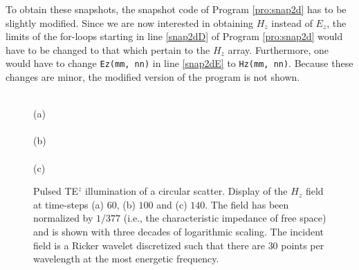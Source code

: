 To obtain these snapshots, the snapshot code of Program
\ref{pro:snap2d} has to be slightly modified.  Since we are now
interested in obtaining $H_z$ instead of $E_z$, the limits of the
for-loops starting in line \ref{snap2dD} of Program \ref{pro:snap2d}
would have to be changed to that which pertain to the $H_z$ array.
Furthermore, one would have to change \verb+Ez(mm, nn)+ in line
\ref{snap2dE} to \verb+Hz(mm, nn)+.  Because these changes are minor,
the modified version of the program is not shown.

\begin{figure}
  \begin{center}
  \\
  (a)
  \\
  \\
  (b)
  \\
  \\
  (c)
  \end{center} \caption{Pulsed TE$^z$ illumination of a circular
  scatter.  Display of the $H_z$ field at time-steps (a) $60$, (b)
  $100$ and (c) $140$.  The field has been normalized by $1/377$
  (i.e., the characteristic impedance of free space) and is shown with
  three decades of logarithmic scaling.  The incident field is a
  Ricker wavelet discretized such that there are $30$ points per
  wavelength at the most energetic frequency.}
  \label{fig:teScatterer}
\end{figure}
